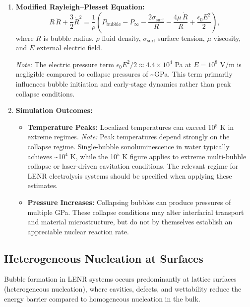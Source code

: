 \documentclass[11pt,a4paper]{article}
\begin{document}
\begin{enumerate}
\def\labelenumi{\arabic{enumi}.}
\item
  \textbf{Modified Rayleigh--Plesset Equation:} \begin{equation}
R\,\ddot{R} + \frac{3}{2}\dot{R}^{2} = \frac{1}{\rho}\left(P_{\text{bubble}} - P_{\infty} - \frac{2\sigma_{\text{surf}}}{R} - \frac{4\mu\,\dot{R}}{R} + \frac{\epsilon_0 E^{2}}{2}\right),
\end{equation} where $R$ is bubble radius, $\rho$ fluid density, $\sigma_{\text{surf}}$ surface tension, $\mu$ viscosity, and $E$ external electric field.

  \emph{Note:} The electric pressure term $\epsilon_0 E^2 / 2 \approx 4.4 \times 10^4$ Pa at $E = 10^8$ V/m is negligible compared to collapse pressures of \textasciitilde GPa. This term primarily influences bubble initiation and early-stage dynamics rather than peak collapse conditions.
\item
  \textbf{Simulation Outcomes:}

  \begin{itemize}
    \item
    \textbf{Temperature Peaks:} Localized temperatures can exceed 10$^{5}$ K in extreme regimes. \emph{Note:} Peak temperatures depend strongly on the collapse regime. Single-bubble sonoluminescence in water typically achieves \textasciitilde10$^{4}$ K, while the 10$^{5}$ K figure applies to extreme multi-bubble collapse or laser-driven cavitation conditions. The relevant regime for LENR electrolysis systems should be specified when applying these estimates.\\
  \item
    \textbf{Pressure Increases:} Collapsing bubbles can produce pressures of multiple GPa. These collapse conditions may alter interfacial transport and material microstructure, but do not by themselves establish an appreciable nuclear reaction rate.
  \end{itemize}
\end{enumerate}

\subsection{Heterogeneous Nucleation at Surfaces}

Bubble formation in LENR systems occurs predominantly at lattice surfaces (heterogeneous nucleation), where cavities, defects, and wettability reduce the energy barrier compared to homogeneous nucleation in the bulk.
\end{document}
